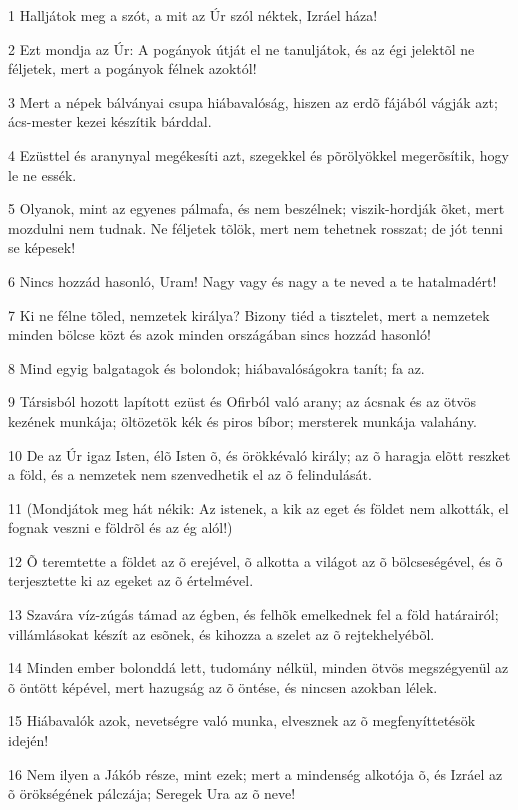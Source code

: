 \par 1 Halljátok meg a szót, a mit az Úr szól néktek, Izráel háza!
\par 2 Ezt mondja az Úr: A pogányok útját el ne tanuljátok, és az égi jelektõl ne féljetek, mert a pogányok félnek azoktól!
\par 3 Mert a népek bálványai csupa hiábavalóság, hiszen az erdõ fájából vágják azt; ács-mester kezei készítik bárddal.
\par 4 Ezüsttel és aranynyal megékesíti azt, szegekkel és põrölyökkel megerõsítik, hogy le ne essék.
\par 5 Olyanok, mint az egyenes pálmafa, és nem beszélnek; viszik-hordják õket, mert mozdulni nem tudnak. Ne féljetek tõlök, mert nem tehetnek rosszat; de jót tenni se képesek!
\par 6 Nincs hozzád hasonló, Uram! Nagy vagy és nagy a te neved a te hatalmadért!
\par 7 Ki ne félne tõled, nemzetek királya? Bizony tiéd a tisztelet, mert a nemzetek minden bölcse közt és azok minden országában sincs hozzád hasonló!
\par 8 Mind egyig balgatagok és bolondok; hiábavalóságokra tanít; fa az.
\par 9 Társisból hozott lapított ezüst és Ofirból való arany; az ácsnak és az ötvös kezének munkája; öltözetök kék és piros bíbor; mersterek munkája valahány.
\par 10 De az Úr igaz Isten, élõ Isten õ, és örökkévaló király; az õ haragja elõtt reszket  a föld, és a nemzetek nem szenvedhetik el az õ felindulását.
\par 11 (Mondjátok meg hát nékik: Az istenek, a kik az eget és földet nem alkották, el fognak veszni e földrõl és az ég alól!)
\par 12 Õ teremtette a földet az õ erejével, õ alkotta a világot az õ bölcseségével, és õ terjesztette ki az egeket az õ értelmével.
\par 13 Szavára víz-zúgás támad az égben, és felhõk emelkednek fel a föld határairól; villámlásokat készít az esõnek, és kihozza a szelet az õ rejtekhelyébõl.
\par 14 Minden ember bolonddá lett, tudomány nélkül, minden ötvös megszégyenül az õ öntött képével, mert hazugság az õ öntése, és nincsen azokban lélek.
\par 15 Hiábavalók azok, nevetségre való munka, elvesznek az õ megfenyíttetésök idején!
\par 16 Nem ilyen a Jákób része, mint ezek; mert a mindenség alkotója õ, és Izráel az õ örökségének pálczája; Seregek Ura az õ neve!
